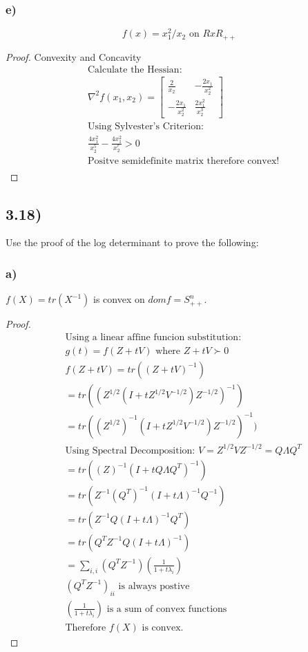 \documentclass[12pt]{article}
\begin{document}
\subsubsection*{e)}
$$f(x) = x_1^2/x_2 \text{ on } RxR_{++}$$
\begin{proof}{Convexity and Concavity}
\begin{align*}
& \text{Calculate the Hessian:}\\
& \nabla^2f(x_1,x_2) = 
\begin{bmatrix}
\frac{2}{x_2} & -\frac{2x_1}{x_2^2} \\
-\frac{2x_1}{x_2^2} & \frac{2x_1^2}{x_2^3}
\end{bmatrix} \\
& \text{Using Sylvester's Criterion:}\\
& \frac{4x_1^2}{x_2^5} - \frac{4x_1^2}{x_2^r} > 0\\
& \text{Positve semidefinite matrix therefore convex!}\\
\end{align*}
\end{proof}

\subsection*{3.18)}
Use the proof of the log determinant to prove the following:

\subsubsection*{a)}

$f(X)= tr(X^{-1})$ is convex on $dom f = S^{n}_{++}$.

\begin{proof}
\begin{align*}
& \text{Using a linear affine funcion substitution:}\\
& g(t) = f(Z + tV) \text{ where } Z + tV \succ 0\\
& f(Z + tV) = tr((Z + tV)^{-1})\\
& = tr((Z^{1/2}(I + tZ^{1/2}V^{-1/2})Z^{-1/2})^{-1})\\
& = tr((Z^{1/2})^{-1}(I + tZ^{1/2}V^{-1/2})Z^{-1/2})^{-1})\\
& \text{Using Spectral Decomposition: $\hat{V} = Z^{1/2}VZ^{-1/2} = Q\Lambda Q^T$}\\
& = tr((Z)^{-1}(I + tQ\Lambda Q^T)^{-1})\\
& = tr(Z^{-1}(Q^T)^{-1}(I + t\Lambda)^{-1}Q^{-1})\\
& = tr(Z^{-1}Q(I + t\Lambda)^{-1}Q^T)\\
& = tr(Q^TZ^{-1}Q(I + t\Lambda)^{-1})\\
& = \sum_{i,i}(Q^TZ^{-1})(\frac{1}{1+t\lambda_i})\\
& \text{$(Q^TZ^{-1})_{ii}$ is always postive}\\
& \text{$(\frac{1}{1+t\lambda_i})$ is a sum of convex functions}\\
& \text{Therefore $f(X)$ is convex.}
\end{align*}
\end{proof}
\end{document}
